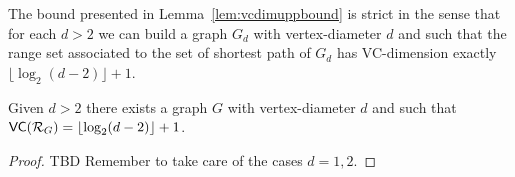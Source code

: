 The bound presented in Lemma~\ref{lem:vcdimuppbound} is strict in the sense that
for each $d>2$ we can build a graph $G_d$ with vertex-diameter $d$ and such
that the range set associated to the set of shortest path of $G_d$ has
VC-dimension exactly $\lfloor\log_2(d-2)\rfloor+1$.

\begin{lemma}
  Given $d>2$ there exists a graph $G$ with vertex-diameter $d$ and such that
  $\mathsf{VC}(\mathcal{R}_G)=\lfloor\log_2(d-2)\rfloor+1$.
\end{lemma}

\begin{proof}
  \XXX TBD Remember to take care of the cases $d=1,2$.
\end{proof}

